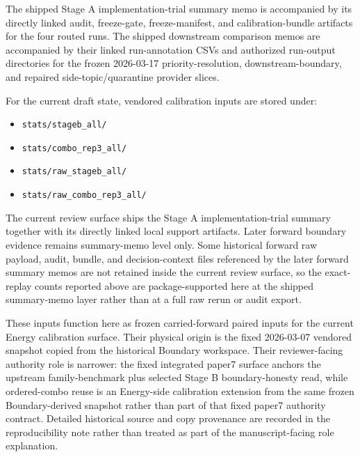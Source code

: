 \documentclass[11pt,a4paper]{article}
\begin{document}
The shipped Stage A implementation-trial summary memo is accompanied by its
directly linked audit, freeze-gate, freeze-manifest, and calibration-bundle
artifacts for the four routed runs. The shipped downstream comparison memos
are accompanied by their linked run-annotation CSVs and authorized run-output
directories for the frozen 2026-03-17 priority-resolution, downstream-boundary,
and repaired side-topic/quarantine provider slices.

For the current draft state, vendored calibration inputs are stored under:
\begin{itemize}
  \item \texttt{stats/stageb\_all/}
  \item \texttt{stats/combo\_rep3\_all/}
  \item \texttt{stats/raw\_stageb\_all/}
  \item \texttt{stats/raw\_combo\_rep3\_all/}
\end{itemize}

The current review surface ships the Stage A implementation-trial summary
together with its directly linked local support artifacts. Later forward
boundary evidence remains summary-memo level only. Some historical forward raw
payload, audit, bundle, and decision-context files referenced by the later
forward summary memos are not retained inside the current review surface, so
the exact-replay counts reported above are package-supported here at the
shipped summary-memo layer rather than at a full raw rerun or audit export.

These inputs function here as frozen carried-forward paired inputs for the current
Energy calibration surface. Their physical origin is the fixed 2026-03-07
vendored snapshot copied from the historical Boundary workspace. Their reviewer-facing
authority role is narrower: the fixed integrated paper7 surface anchors the upstream
family-benchmark plus selected Stage B boundary-honesty read, while ordered-combo
reuse is an Energy-side calibration extension from the same frozen Boundary-derived
snapshot rather than part of that fixed paper7 authority contract. Detailed historical
source and copy provenance are recorded in the reproducibility note rather than treated
as part of the manuscript-facing role explanation.
\end{document}
